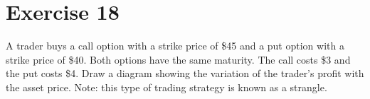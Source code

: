 \documentclass{article}
\begin{document}
\begin{center}
\end{center}
\break

\section*{Exercise 18}
A trader buys a call option with a strike price of \$45 and a put option with a strike price of \$40.
Both options have the same maturity. The call costs \$3 and the put costs \$4. Draw a diagram showing the
variation of the trader’s profit with the asset price. Note: this type of trading strategy is known as a strangle. \\
\end{document}
